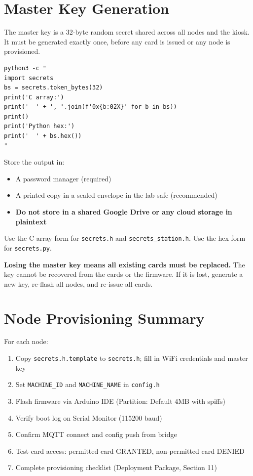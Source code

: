 \section{Master Key Generation}
\label{sec:masterkey}

The master key is a 32-byte random secret shared across all nodes and the kiosk. It must be generated exactly once, before any card is issued or any node is provisioned.

\begin{lstlisting}[style=bashstyle]
python3 -c "
import secrets
bs = secrets.token_bytes(32)
print('C array:')
print('  ' + ', '.join(f'0x{b:02X}' for b in bs))
print()
print('Python hex:')
print('  ' + bs.hex())
"
\end{lstlisting}

Store the output in:
\begin{itemize}[leftmargin=1.5em]
    \item A password manager (required)
    \item A printed copy in a sealed envelope in the lab safe (recommended)
    \item \textbf{Do not store in a shared Google Drive or any cloud storage in plaintext}
\end{itemize}

Use the C array form for \texttt{secrets.h} and \texttt{secrets\_station.h}. Use the hex form for \texttt{secrets.py}.

\begin{warnbox}
\textbf{Losing the master key means all existing cards must be replaced.} The key cannot be recovered from the cards or the firmware. If it is lost, generate a new key, re-flash all nodes, and re-issue all cards.
\end{warnbox}

\section{Node Provisioning Summary}

For each node:

\begin{enumerate}[leftmargin=1.5em]
    \item Copy \texttt{secrets.h.template} to \texttt{secrets.h}; fill in WiFi credentials and master key
    \item Set \texttt{MACHINE\_ID} and \texttt{MACHINE\_NAME} in \texttt{config.h}
    \item Flash firmware via Arduino IDE (Partition: Default 4MB with spiffs)
    \item Verify boot log on Serial Monitor (115200 baud)
    \item Confirm MQTT connect and config push from bridge
    \item Test card access: permitted card GRANTED, non-permitted card DENIED
    \item Complete provisioning checklist (Deployment Package, Section 11)
\end{enumerate}

